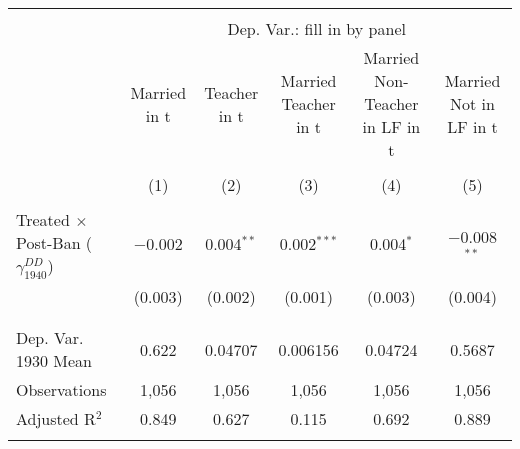 
\begin{tabular}{@{\extracolsep{5pt}}lccccc} 
\\[-1.8ex]\hline 
\hline \\[-1.8ex] 
 & \multicolumn{5}{c}{Dep. Var.: fill in by panel} \\ 
\cline{2-6} 
 & Married in t & Teacher in t & Married Teacher in t & Married Non-Teacher in LF in t & Married Not in LF in t \\ 
\\[-1.8ex] & (1) & (2) & (3) & (4) & (5)\\ 
\hline \\[-1.8ex] 
 Treated $\times$ Post-Ban ($\gamma_{1940}^{DD}$) & $-$0.002 & 0.004$^{**}$ & 0.002$^{***}$ & 0.004$^{*}$ & $-$0.008$^{**}$ \\ 
  & (0.003) & (0.002) & (0.001) & (0.003) & (0.004) \\ 
  & & & & & \\ 
\hline \\[-1.8ex] 
Dep. Var. 1930 Mean & 0.622 & 0.04707 & 0.006156 & 0.04724 & 0.5687 \\ 
Observations & 1,056 & 1,056 & 1,056 & 1,056 & 1,056 \\ 
Adjusted R$^{2}$ & 0.849 & 0.627 & 0.115 & 0.692 & 0.889 \\ 
\hline 
\hline \\[-1.8ex] 
\end{tabular} 
